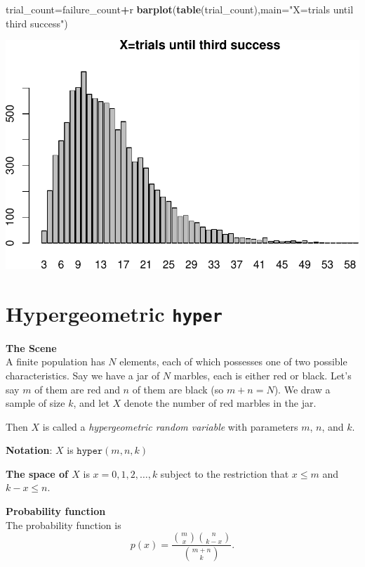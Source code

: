 \documentclass[
]{book}
\newenvironment{Shaded}{\begin{snugshade}}{\end{snugshade}}
\newcommand{\AttributeTok}[1]{\textcolor[rgb]{0.13,0.29,0.53}{#1}}
\newcommand{\FunctionTok}[1]{\textcolor[rgb]{0.13,0.29,0.53}{\textbf{#1}}}
\newcommand{\NormalTok}[1]{#1}
\newcommand{\OtherTok}[1]{\textcolor[rgb]{0.56,0.35,0.01}{#1}}
\newcommand{\SpecialCharTok}[1]{\textcolor[rgb]{0.81,0.36,0.00}{\textbf{#1}}}
\newcommand{\StringTok}[1]{\textcolor[rgb]{0.31,0.60,0.02}{#1}}
\theoremstyle{definition}
\theoremstyle{definition}
\theoremstyle{definition}
\theoremstyle{definition}
\theoremstyle{remark}
\begin{document}
\begin{Shaded}
\begin{Highlighting}[]
\NormalTok{trial\_count}\OtherTok{=}\NormalTok{failure\_count}\SpecialCharTok{+}\NormalTok{r}
\FunctionTok{barplot}\NormalTok{(}\FunctionTok{table}\NormalTok{(trial\_count),}\AttributeTok{main=}\StringTok{"X=trials until third success"}\NormalTok{)}
\end{Highlighting}
\end{Shaded}

\includegraphics{math340-notes_files/figure-latex/unnamed-chunk-145-1.pdf}

\section{\texorpdfstring{Hypergeometric \texttt{hyper}}{Hypergeometric hyper}}\label{hyperR}

\textbf{The Scene}\\
A finite population has \(N\) elements, each of which possesses one of two possible characteristics. Say we have a jar of \(N\) marbles, each is either red or black. Let's say \(m\) of them are red and \(n\) of them are black (so \(m + n = N\)). We draw a sample of size \(k\), and let \(X\) denote the number of red marbles in the jar.

Then \(X\) is called a \emph{hypergeometric random variable} with parameters \(m\), \(n\), and \(k\).

\textbf{Notation}: \(X\) is \(\texttt{hyper}(m,n,k)\)

\textbf{The space of \(X\)} is \(x = 0,1,2,\ldots,k\) subject to the restriction that \(x \leq m\) and \(k - x \leq n\).

\textbf{Probability function}\\
The probability function is \[p(x)= \frac{\binom{m}{x}\binom{n}{k-x}}{\binom{m+n}{k}}.\]
\end{document}
